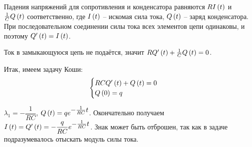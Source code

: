 \documentclass[a5paper,10pt]{article}
\begin{document}
Падения напряжений для сопротивления и конденсатора равняются $RI\left(t\right)$ и $\frac {1}{C} Q\left(t\right)$ соответственно, где $I\left(t\right)$ -- искомая сила тока, $Q\left(t\right)$ -- заряд конденсатора. При последовательном соединении силы тока всех элементов цепи одинаковы, и поэтому $Q'\br{t} = \linebreak I\br{t}$.

Ток в замыкающуюся цепь не подаётся, значит $RQ'\left(t\right) + \frac {1} {C} Q\left(t\right) = 0$.

Итак, имеем задачу Коши:
$$\begin{cases}
    RCQ'\left(t\right) + Q\left(t\right) = 0 \\
    Q\left(0\right) = q
\end{cases}$$

$\lambda_{1} = -\dfrac{1}{RC}$, $Q\br{t} = q \tpow{e} {-\frac {1} {RC} t}$. Окончательно получаем $I\br{t} = Q'\br{t} = -\dfrac{q}{RC} \tpow{e} {-\frac {1} {RC} t}$.
Знак может быть отброшен, так как в задаче подразумевалось отыскать модуль силы тока.
\end{document}
